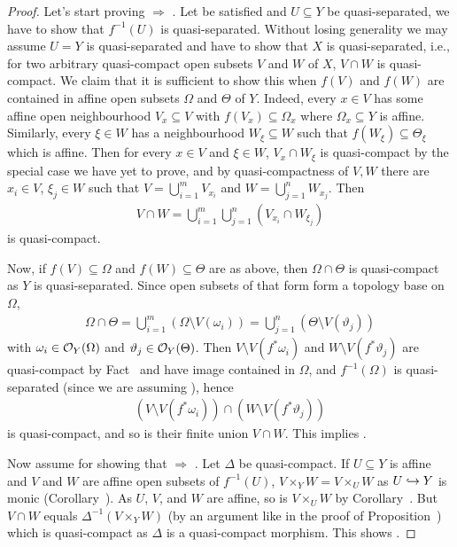 \documentclass[a4paper,parskip=half,numbers=enddot, DIV=12]{scrreprt}
\begin{document}
\begin{proof}
    Let's start proving  $\Rightarrow$ . Let  be satisfied and $U\subseteq Y$ be quasi-separated, we have to show that $f^{-1}(U)$ is quasi-separated. Without losing generality we may assume $U=Y$ is quasi-separated and have to show that $X$ is quasi-separated, i.e., for two arbitrary quasi-compact open subsets $V$ and $W$ of $X$, $V\cap W$ is quasi-compact. We claim that it is sufficient to show this when $f(V)$ and $f(W)$ are contained in affine open subsets $\Omega$ and $\Theta$ of $Y$. Indeed, every $x\in V$ has some affine open neighbourhood $V_x\subseteq V$ with $f(V_x)\subseteq \Omega_x$ where $\Omega_x \subseteq Y$ is affine. Similarly, every $\xi\in W$ has a neighbourhood $W_\xi\subseteq W$ such that $f(W_\xi)\subseteq \Theta_\xi$ which is affine. Then for every $x\in V$ and $\xi \in W$, $V_x\cap W_\xi$ is quasi-compact by the special case we have yet to prove, and by quasi-compactness of $V,W$ there are $x_i\in V$, $\xi_j\in W$ such that $V=\bigcup_{i=1}^m V_{x_i}$ and $W = \bigcup_{j=1}^n W_{x_j}$. Then
    \begin{align*}
        V\cap W = \bigcup_{i=1}^m \bigcup_{j=1}^n (V_{x_i}\cap W_{\xi_j})
    \end{align*}
    is quasi-compact.
    
    Now, if $f(V)\subseteq \Omega$ and $f(W)\subseteq \Theta$ are as above, then $\Omega\cap \Theta$ is quasi-compact as $Y$ is quasi-separated. Since open subsets of that form form a topology base on $\Omega$, 
    \begin{align*}
        \Omega\cap \Theta = \bigcup_{i=1}^m (\Omega\setminus V(\omega_i))=\bigcup_{j=1}^n(\Theta \setminus V(\vartheta_j))
    \end{align*}
    with $\omega_i\in \mathcal{O}_Y(\Omega)$ and $\vartheta_j\in \mathcal{O}_Y(\Theta)$. Then $V\setminus V(f^*\omega_i)$ and $W\setminus V(f^* \vartheta_j)$ are quasi-compact by Fact~ and have image contained in $\Omega$, and $f^{-1}(\Omega)$ is quasi-separated (since we are assuming ), hence
    \begin{align*}
        (V\setminus V(f^*\omega_i))\cap (W\setminus V(f^* \vartheta_j))
    \end{align*}
    is quasi-compact, and so is their finite union $V\cap W$. This implies .
    
    Now assume  for showing that  $\Rightarrow$ . Let $\Delta$ be quasi-compact. If $U\subseteq Y$ is affine and $V$ and $W$ are affine open subsets of $f^{-1}(U)$, $V\times_Y W = V\times_U W$ as $U\monomorphism Y$ is monic (Corollary~). As $U$, $V$, and $W$ are affine, so is $V\times_U W$ by Corollary~. But $V\cap W$ equals $\Delta^{-1}(V\times_Y W)$ (by an argument like in the proof of Proposition~) which is quasi-compact as $\Delta$ is a quasi-compact morphism. This shows .
    

\end{proof}
\end{document}

